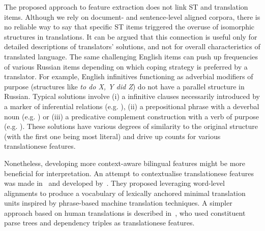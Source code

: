The proposed approach to feature extraction does not link ST and translation items. Although we rely on document- and sentence-level aligned corpora, there is no reliable way to say that specific ST items triggered the overuse of isomorphic structures in translations. It can be argued that this connection is useful only for detailed descriptions of translators' solutions, and not for overall characteristics of translated language. The same challenging English items can push up frequencies of various Russian items depending on which coping strategy is preferred by a translator. For example, English infinitives functioning as adverbial modifiers of purpose (structures like \textit{to do X, Y did Z}) do not have a parallel structure in Russian. Typical solutions involve (i) a infinitive clauses necessarily introduced by a marker of inferential relations (e.g. ), (ii) a prepositional phrase with a deverbal noun (e.g.  ) or (iii) a predicative complement construction with a verb of purpose (e.g. ). These solutions have various degrees of similarity to the original structure (with the first one being most literal) and drive up counts for various translationese features. 

Nonetheless, developing more context-aware bilingual features might be more beneficial for interpretation.
An attempt to contextualise translationese features was made in~\cite{Eetemadi2015} and developed by~\citet{Sominsky2019}. They proposed leveraging word-level alignments to produce a vocabulary of lexically anchored minimal translation units inspired by phrase-based machine translation techniques. A simpler approach based on human translations is described in~\citet{Hu2018}, who used constituent parse trees and dependency triples as translationese features.


